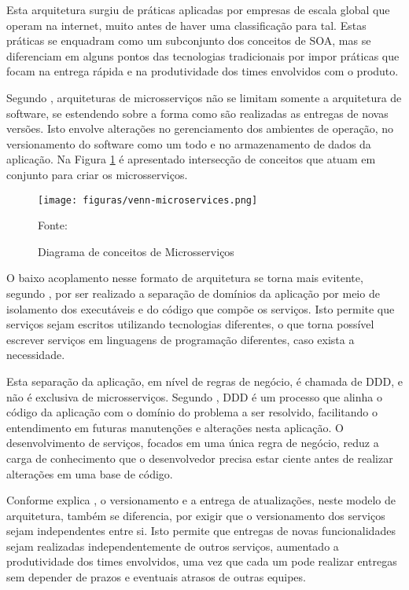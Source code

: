 Esta arquitetura surgiu de práticas aplicadas por empresas de escala global que
operam na internet, muito antes de haver uma classificação para tal. Estas
práticas se enquadram como um subconjunto dos conceitos de \ac{SOA}, mas se
diferenciam em alguns pontos das tecnologias tradicionais por impor práticas
que focam na entrega rápida e na produtividade dos times envolvidos com
o produto.

Segundo , arquiteturas de microsserviços não se limitam
somente a arquitetura de software, se estendendo sobre a forma como são
realizadas as entregas de novas versões. Isto envolve alterações no
gerenciamento dos ambientes de operação, no versionamento do software como um
todo e no armazenamento de dados da aplicação. Na Figura
\ref{fig:venn-microservices} é apresentado intersecção de conceitos que
atuam em conjunto para criar os microsserviços.

\begin{figure}[H]
	\centering
	\caption{Diagrama de conceitos de Microsserviços}
	\texttt{[image: figuras/venn-microservices.png]}

	\label{fig:venn-microservices}
	\footnotesize Fonte: 
\end{figure}

O baixo acoplamento nesse formato de arquitetura se torna mais evitente,
segundo , por ser realizado a separação de domínios da
aplicação por meio de isolamento dos executáveis e do código que compõe os
serviços. Isto permite que serviços sejam escritos utilizando tecnologias
diferentes, o que torna possível escrever serviços em linguagens de
programação diferentes, caso exista a necessidade.

Esta separação da aplicação, em nível de regras de negócio, é chamada
de \ac{DDD}, e não é exclusiva de microsserviços. Segundo
, \ac{DDD} é um processo que alinha o
código da aplicação com o domínio do problema a ser resolvido,
facilitando o entendimento em futuras manutenções e alterações nesta
aplicação. O desenvolvimento de serviços, focados em uma única regra de
negócio, reduz a carga de conhecimento que o desenvolvedor precisa estar
ciente antes de realizar alterações em uma base de código.

Conforme explica , o versionamento e a entrega de
atualizações, neste modelo de arquitetura, também se diferencia, por exigir
que o versionamento dos serviços sejam independentes entre si. Isto permite
que entregas de novas funcionalidades sejam realizadas independentemente de
outros serviços, aumentado a produtividade dos times envolvidos, uma vez que
cada um pode realizar entregas sem depender de prazos e eventuais atrasos
de outras equipes.

